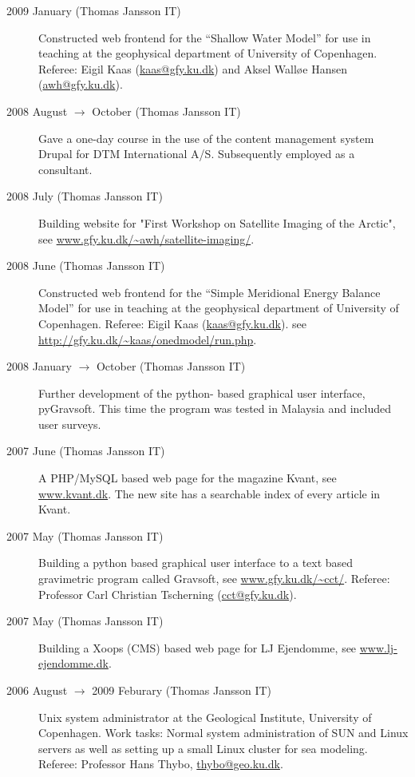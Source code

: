 \documentclass[margin,line,a4paper]{resume05}
\begin{document}
\begin{resume}
\begin{description}
    \item[2009 January (Thomas Jansson IT)] Constructed web frontend for 
    the ``Shallow Water Model'' for use in teaching at the geophysical
    department of University of Copenhagen. Referee: Eigil Kaas
    (\href{mailto:kaas@gfy.ku.dk}{kaas@gfy.ku.dk}) and Aksel Walløe Hansen
    (\href{mailto:awh@gfy.ku.dk}{awh@gfy.ku.dk}).
    \item[2008 August $\rightarrow$ October (Thomas Jansson IT)] Gave a one-day course 
    in the use of the content management system Drupal for DTM International
    A/S. Subsequently employed as a consultant. 
    \item[2008 July (Thomas Jansson IT)] Building website for "First Workshop on Satellite Imaging
    of the Arctic", see \url{www.gfy.ku.dk/~awh/satellite-imaging/}. 
    \item[2008 June (Thomas Jansson IT)] Constructed web frontend for 
     the ``Simple Meridional Energy Balance Model'' for use in teaching at the geophysical
    department of University of Copenhagen. Referee: Eigil Kaas
    (\href{mailto:kaas@gfy.ku.dk}{kaas@gfy.ku.dk}). see
    \url{http://gfy.ku.dk/~kaas/onedmodel/run.php}. 
    \item[2008 January $\rightarrow$ October (Thomas Jansson IT) ] Further development of the python-
    based graphical user interface, pyGravsoft. This time the program was
    tested in Malaysia and included user surveys. 
    \item[2007 June (Thomas Jansson IT) ] A PHP/MySQL based web page for the magazine Kvant, see
    \url{www.kvant.dk}. The new site has a searchable index of every
    article in Kvant. 
    \item[2007 May (Thomas Jansson IT) ] Building a python based graphical user interface to a text
    based gravimetric program called Gravsoft, see
    \url{www.gfy.ku.dk/~cct/}. Referee: Professor Carl Christian Tscherning
    (\href{mailto:cct@gfy.ku.dk}{cct@gfy.ku.dk}).
    \item[2007 May (Thomas Jansson IT)] Building a Xoops (CMS) based web page for LJ Ejendomme, see
    \url{www.lj-ejendomme.dk}.
    \item[2006 August $\rightarrow$ 2009 Feburary (Thomas Jansson IT)] Unix system administrator at the Geological
    Institute, University of Copenhagen. Work tasks: Normal system
    administration of SUN and Linux servers as well as setting up a small Linux
    cluster for sea modeling. Referee: Professor Hans Thybo,
    \href{mailto:thybo@geo.ku.dk}{thybo@geo.ku.dk}. 

\end{description}
\end{resume}
\end{document}
